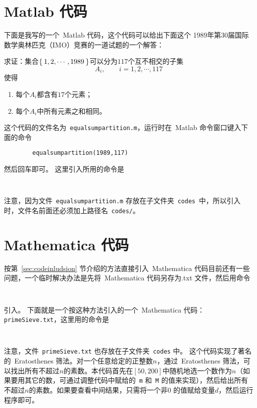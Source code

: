 \section{Matlab 代码} \label{appendix:A}

下面是我写的一个~Matlab
代码，这个代码可以给出下面这个
1989年第30届国际数学奥林匹克（IMO）竞赛的一道试题的一个解答：\vspace{.5cm}

\noindent 求证：集合$\Set{1, 2,
\cdots,1989}$可以分为$117$个互不相交的子集
$$A_i, \qquad i = 1, 2, \cdots,117$$
使得
\begin{enumerate}
    \item 每个$A_i$都含有$17$个元素；
    \item 每个$A_i$中所有元素之和相同。
\end{enumerate}\vspace{.5cm}

这个代码的文件名为~{\tt equalsumpartition.m}，运行时在~Matlab 命令窗口键入下面的命令
\begin{verbatim}
        equalsumpartition(1989,117)
\end{verbatim}
然后回车即可。
这里引入所用的命令是
\begin{verbatim}
       
\end{verbatim}
注意，因为文件~{\tt equalsumpartition.m} 存放在子文件夹~{\tt codes }中，所以引入时，文件名前面还必须加上路径名~{\tt codes/}。

\section{Mathematica 代码}\label{appendix:B}
按第~\ref{sec:codeinludsion} 节介绍的方法直接引入~Mathematica 代码目前还有一些问题，一个临时解决办法是先将~Mathematica 代码另存为.txt 文件，然后用命令
\begin{verbatim}
        
\end{verbatim}
引入。%
下面就是一个按这种方法引入的一个~Mathematica 代码：{\tt primeSieve.txt}，这里用的命令是
\begin{verbatim}
       
\end{verbatim}
注意，文件~{\tt primeSieve.txt} 也存放在子文件夹~{\tt codes} 中。
这个代码实现了著名的~Eratosthenes 筛法。对一个任意给定的正整数$n$，通过~Eratosthenes 筛法，可以找出所有不超过$n$的素数。本代码首先在$[50,200]$中随机地选一个数作为$n$（如果要用其它的数，可通过调整代码中赋给的~{\tt m} 和~{\tt M} 的值来实现），然后给出所有不超过$n$的素数。如果要查看中间结果，只需将一个非$0$ 的值赋给变量$d$，然后运行程序即可。

